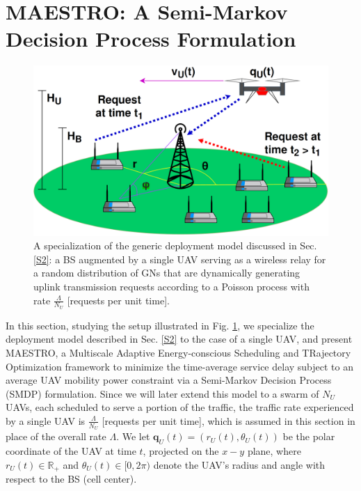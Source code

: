 \documentclass[12pt, draftcls, onecolumn]{IEEEtran}
\theoremstyle{plain}
\theoremstyle{definition}
\theoremstyle{remark}
\begin{document}
\section{MAESTRO: A Semi-Markov Decision Process Formulation}\label{S3}
\vspace{-2mm}

\begin{figure} [t]
    \centering
    \includegraphics[width=0.7\linewidth]{figs/System_Architecture_II.png}
    \caption{A specialization of the generic deployment model discussed in Sec. \ref{S2}: a BS augmented by a single UAV serving as a wireless relay for a random distribution of GNs that are dynamically generating uplink transmission requests according to a Poisson process with rate $\frac{\Lambda}{N_{U}}$ [requests per unit time].}
    \vspace{-8mm}
    \label{F2}
\end{figure}

In this section, studying the setup illustrated in Fig. \ref{F2}, we specialize the deployment model described in Sec. \ref{S2} to the case of a single UAV, and present MAESTRO, a Multiscale Adaptive Energy-conscious Scheduling and TRajectory Optimization framework to minimize the time-average service delay subject to an average UAV mobility power constraint via a Semi-Markov Decision Process (SMDP) formulation. Since we will later extend this model to a swarm of $N_U$ UAVs, each scheduled to serve a portion of the traffic, the traffic rate experienced by a single UAV is $\frac{\Lambda}{N_U}$ [requests per unit time], which is assumed in this section in place of the overall rate $\Lambda$. We let $\mathbf{q}_{U}(t){=}(r_{U}(t),\theta_{U}(t))$ be the polar coordinate of the UAV at time $t$, projected on the $x{-}y$ plane, where $r_{U}(t){\in}\mathbb{R}_{+}$ and $\theta_{U}(t){\in}[0,2\pi)$ denote the UAV's radius and angle with respect to the BS (cell center).
\end{document}
